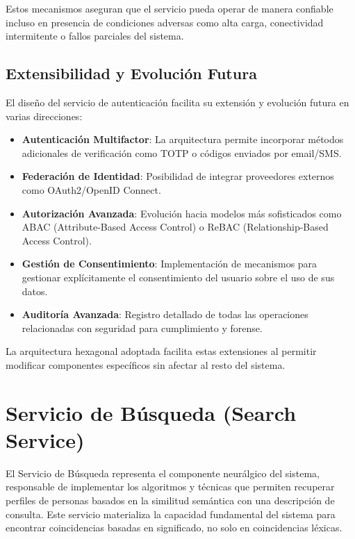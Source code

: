 \documentclass[12pt,a4paper]{article}
\begin{document}
Estos mecanismos aseguran que el servicio pueda operar de manera confiable incluso en presencia de condiciones adversas como alta carga, conectividad intermitente o fallos parciales del sistema.

\subsection{Extensibilidad y Evolución Futura}
\label{subsec:as-extension}

El diseño del servicio de autenticación facilita su extensión y evolución futura en varias direcciones:

\begin{itemize}
    \item \textbf{Autenticación Multifactor}: La arquitectura permite incorporar métodos adicionales de verificación como TOTP o códigos enviados por email/SMS.
    
    \item \textbf{Federación de Identidad}: Posibilidad de integrar proveedores externos como OAuth2/OpenID Connect.
    
    \item \textbf{Autorización Avanzada}: Evolución hacia modelos más sofisticados como ABAC (Attribute-Based Access Control) o ReBAC (Relationship-Based Access Control).
    
    \item \textbf{Gestión de Consentimiento}: Implementación de mecanismos para gestionar explícitamente el consentimiento del usuario sobre el uso de sus datos.
    
    \item \textbf{Auditoría Avanzada}: Registro detallado de todas las operaciones relacionadas con seguridad para cumplimiento y forense.
\end{itemize}

La arquitectura hexagonal adoptada facilita estas extensiones al permitir modificar componentes específicos sin afectar al resto del sistema.

\section{Servicio de Búsqueda (Search Service)}
\label{sec:search-service}

El Servicio de Búsqueda representa el componente neurálgico del sistema, responsable de implementar los algoritmos y técnicas que permiten recuperar perfiles de personas basados en la similitud semántica con una descripción de consulta. Este servicio materializa la capacidad fundamental del sistema para encontrar coincidencias basadas en significado, no solo en coincidencias léxicas.
\end{document}
